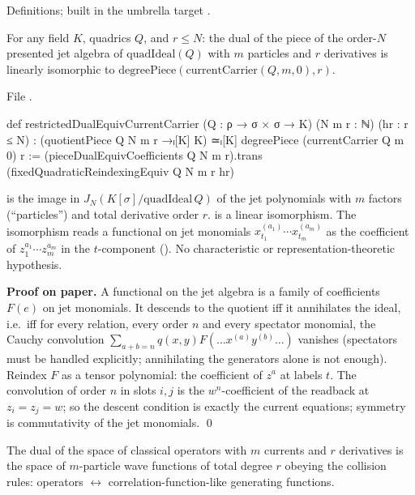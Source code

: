 \begin{status}
Definitions; built in the umbrella target .
\end{status}

\begin{theorem}\label{l24:thm:B4}
For any field $K$, quadrics $Q$, and $r\le N$: the dual of the piece of the order-$N$ presented jet algebra of
$\mathrm{quadIdeal}(Q)$ with $m$ particles and $r$ derivatives is linearly isomorphic to
$\mathrm{degreePiece}(\mathrm{currentCarrier}(Q,m,0),r)$.
\end{theorem}
\noindent File .
\begin{leancode}
def restrictedDualEquivCurrentCarrier (Q : ρ → σ × σ → K) (N m r : ℕ) (hr : r ≤ N) :
    (quotientPiece Q N m r →ₗ[K] K) ≃ₗ[K] degreePiece (currentCarrier Q m 0) r :=
  (pieceDualEquivCoefficients Q N m r).trans (fixedQuadraticReindexingEquiv Q N m r hr)
\end{leancode}

\begin{dictionary}
 is the image in $J_N(K[\sigma]/\mathrm{quadIdeal}\,Q)$ of the jet polynomials with $m$
factors (``particles'') and total derivative order $r$.  is a linear isomorphism. The isomorphism
reads a functional on jet monomials $x_{t_1}^{(a_1)}\cdots x_{t_m}^{(a_m)}$ as the coefficient of
$z_1^{a_1}\cdots z_m^{a_m}$ in the $t$-component (). No
characteristic or representation-theoretic hypothesis.
\end{dictionary}

\textbf{Proof on paper.} A functional on the jet algebra is a family of coefficients $F(e)$ on jet
monomials. It descends to the quotient iff it annihilates the ideal, i.e.\ iff for every relation, every
order $n$ and every spectator monomial, the Cauchy convolution $\sum_{a+b=n}q(x,y)F(\dots x^{(a)}y^{(b)}\dots)$
vanishes (spectators must be handled explicitly; annihilating the generators alone is not enough). Reindex
$F$ as a tensor polynomial: the coefficient of $z^{a}$ at labels $t$. The convolution of order $n$ in slots
$i,j$ is the $w^n$-coefficient of the readback at $z_i=z_j=w$; so the descent condition is exactly the
current equations; symmetry is commutativity of the jet monomials. \qed

\begin{physics}
The dual of the space of classical operators with $m$ currents and $r$ derivatives is the space of
$m$-particle wave functions of total degree $r$ obeying the collision rules: operators $\leftrightarrow$
correlation-function-like generating functions.
\end{physics}

